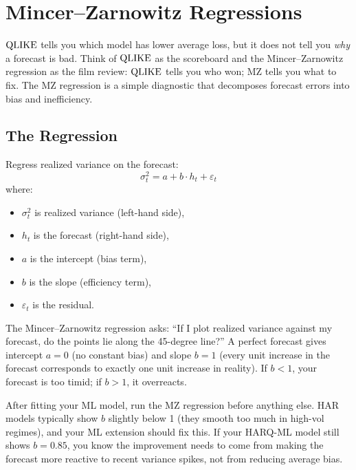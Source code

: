 \section{Mincer--Zarnowitz Regressions}
\label{sec:eval-mz}

$\operatorname{QLIKE}$ tells you which model has lower average loss, but it does not tell you \emph{why} a forecast is bad.
Think of $\operatorname{QLIKE}$ as the scoreboard and the Mincer--Zarnowitz regression as the film review: $\operatorname{QLIKE}$ tells you who won; MZ tells you what to fix.
The MZ regression is a simple diagnostic that decomposes forecast errors into bias and inefficiency.

\subsection{The Regression}

Regress realized variance on the forecast:
\begin{equation}
\label{eq:mz}
\sigma^2_t = a + b \cdot h_t + \varepsilon_t
\end{equation}
where:
\begin{itemize}[nosep]
  \item $\sigma^2_t$ is realized variance (left-hand side),
  \item $h_t$ is the forecast (right-hand side),
  \item $a$ is the intercept (bias term),
  \item $b$ is the slope (efficiency term),
  \item $\varepsilon_t$ is the residual.
\end{itemize}

\begin{intuition}
The Mincer--Zarnowitz regression asks: ``If I plot realized variance against my forecast, do the points lie along the 45-degree line?''
A perfect forecast gives intercept $a = 0$ (no constant bias) and slope $b = 1$ (every unit increase in the forecast corresponds to exactly one unit increase in reality).
If $b < 1$, your forecast is too timid; if $b > 1$, it overreacts.
\end{intuition}

\begin{projectconnection}
After fitting your ML model, run the MZ regression before anything else.
HAR models typically show $b$ slightly below 1 (they smooth too much in high-vol regimes), and your ML extension should fix this.
If your HARQ-ML model still shows $b = 0.85$, you know the improvement needs to come from making the forecast more reactive to recent variance spikes, not from reducing average bias.
\end{projectconnection}

